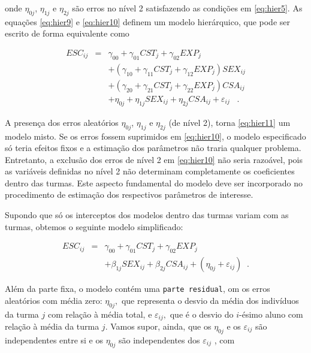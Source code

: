 \documentclass[]{book}
\theoremstyle{definition}
\theoremstyle{definition}
\theoremstyle{definition}
\theoremstyle{remark}
\begin{document}
onde \(\eta _{0j}\), \(\eta _{1j}\) e \(\eta _{2j}\) são erros no nível
2 satisfazendo as condições em \eqref{eq:hier5}. As equações
\eqref{eq:hier9} e \eqref{eq:hier10} definem um modelo hierárquico, que pode
ser escrito de forma equivalente como

\begin{eqnarray}
ESC_{ij} &=&\gamma _{00}+\gamma _{01}CST_{j}+\gamma _{02}EXP_{j}
\label{eq:hier11} \\
&&+\left( \gamma _{10}+\gamma _{11}CST_{j}+\gamma _{12}EXP_{j}\right)
SEX_{ij}  \nonumber \\
&&+\left( \gamma _{20}+\gamma _{21}CST_{j}+\gamma _{22}EXP_{j}\right)
CSA_{ij}  \nonumber \\
&&+\eta _{0j}+\eta _{1j}SEX_{ij}+\eta _{2j}CSA_{ij}+\varepsilon _{ij}\;\;\;.
\nonumber
\end{eqnarray}

A presença dos erros aleatórios \(\eta _{0j}\), \(\eta _{1j}\) e
\(\eta _{2j}\) (de nível 2), torna \eqref{eq:hier11} um modelo misto. Se
os erros fossem suprimidos em \eqref{eq:hier10}, o modelo especificado só
teria efeitos fixos e a estimação dos parâmetros não traria qualquer
problema. Entretanto, a exclusão dos erros de nível 2 em \eqref{eq:hier10}
não seria razoável, pois as variáveis definidas no nível 2 não
determinam completamente os coeficientes dentro das turmas. Este aspecto
fundamental do modelo deve ser incorporado no procedimento de estimação
dos respectivos parâmetros de interesse.

Supondo que só os interceptos dos modelos dentro das turmas variam com
as turmas, obtemos o seguinte modelo simplificado:

\begin{eqnarray}
ESC_{ij} &=&\gamma _{00}+\gamma _{01}CST_{j}+\gamma _{02}EXP_{j}
\label{eq:hier12} \\
&&+\beta _{1j}SEX_{ij}+\beta _{2j}CSA_{ij}+\left( \eta _{0j}+\varepsilon
_{ij}\right) \;\;.  \nonumber
\end{eqnarray}

Além da parte fixa, o modelo contém uma \texttt{parte\ residual}, om os
erros aleatórios com média zero: \(\eta _{0j},\) que representa o desvio
da média dos indivíduos da turma \(j\) com relação à média total, e
\(\varepsilon _{ij},\) que é o desvio do \(i\)-ésimo aluno com relação à
média da turma \(j\). Vamos supor, ainda, que os \(\eta _{0j}\) e os
\(\varepsilon _{ij}\) são independentes entre si e os \(\eta _{0j}\) são
independentes dos \(\varepsilon _{ij}\) , com
\end{document}
